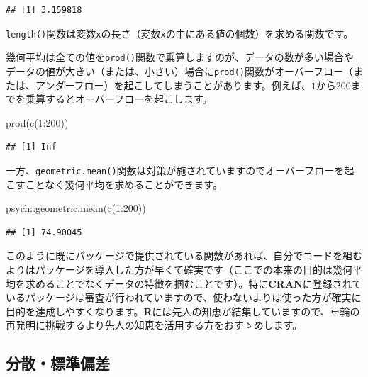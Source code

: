 \documentclass[
  12pt,
]{book}
\newenvironment{Shaded}{\begin{snugshade}}{\end{snugshade}}
\newcommand{\DecValTok}[1]{\textcolor[rgb]{0.00,0.00,0.81}{#1}}
\newcommand{\FunctionTok}[1]{\textcolor[rgb]{0.00,0.00,0.00}{#1}}
\newcommand{\NormalTok}[1]{#1}
\newcommand{\SpecialCharTok}[1]{\textcolor[rgb]{0.00,0.00,0.00}{#1}}
\begin{document}
\begin{verbatim}
## [1] 3.159818
\end{verbatim}

\texttt{length()}関数は変数\texttt{x}の長さ（変数\texttt{x}の中にある値の個数）を求める関数です。

幾何平均は全ての値を\texttt{prod()}関数で乗算しますのが、データの数が多い場合やデータの値が大きい（または、小さい）場合に\texttt{prod()}関数がオーバーフロー（または、アンダーフロー）を起こしてしまうことがあります。例えば、\(1\)から\(200\)までを乗算するとオーバーフローを起こします。

\begin{Shaded}
\begin{Highlighting}[numbers=left,,]
\FunctionTok{prod}\NormalTok{(}\FunctionTok{c}\NormalTok{(}\DecValTok{1}\SpecialCharTok{:}\DecValTok{200}\NormalTok{))}
\end{Highlighting}
\end{Shaded}

\begin{verbatim}
## [1] Inf
\end{verbatim}

一方、\texttt{geometric.mean()}関数は対策が施されていますのでオーバーフローを起こすことなく幾何平均を求めることができます。

\begin{Shaded}
\begin{Highlighting}[numbers=left,,]
\NormalTok{psych}\SpecialCharTok{::}\FunctionTok{geometric.mean}\NormalTok{(}\FunctionTok{c}\NormalTok{(}\DecValTok{1}\SpecialCharTok{:}\DecValTok{200}\NormalTok{))}
\end{Highlighting}
\end{Shaded}

\begin{verbatim}
## [1] 74.90045
\end{verbatim}

このように既にパッケージで提供されている関数があれば、自分でコードを組むよりはパッケージを導入した方が早くて確実です（ここでの本来の目的は幾何平均を求めることでなくデータの特徴を掴むことです）。特に\textbf{CRAN}に登録されているパッケージは審査が行われていますので、使わないよりは使った方が確実に目的を達成しやすくなります。\textbf{R}には先人の知恵が結集していますので、車輪の再発明に挑戦するより先人の知恵を活用する方をおすゝめします。

\hypertarget{ux5206ux6563ux6a19ux6e96ux504fux5dee}{%
\subsection{分散・標準偏差}\label{ux5206ux6563ux6a19ux6e96ux504fux5dee}}
\end{document}

